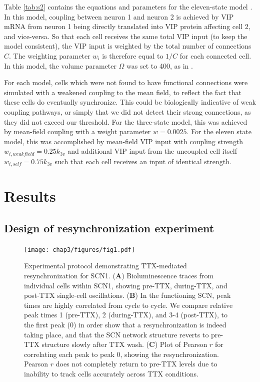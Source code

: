 Table \ref{tab:s2} contains the equations and parameters for the eleven-state model \cite{Abel2015a}.
In this model, coupling between neuron 1 and neuron 2 is achieved by VIP mRNA from neuron 1 being directly translated into VIP protein affecting cell 2, and vice-versa.
So that each cell receives the same total VIP input (to keep the model consistent), the VIP input is weighted by the total number of connections $C$.
The weighting parameter $w_i$ is therefore equal to $1/C$ for each connected cell.
In this model, the volume parameter $\Omega$ was set to 400, as in \cite{Abel2015a}.

For each model, cells which were not found to have functional connections were simulated with a weakened coupling to the mean field, to reflect the fact that these cells do eventually synchronize.
This could be biologically indicative of weak coupling pathways, or simply that we did not detect their strong connections, as they did not exceed our threshold.
For the three-state model, this was achieved by mean-field coupling with a weight parameter $w=0.0025$.
For the eleven state model, this was accomplished by mean-field VIP input with coupling strength $w_{i,weakfield}=0.25k_{3v}$ and additional VIP input from the uncoupled cell itself $w_{i,self}=0.75k_{3v}$ such that each cell receives an input of identical strength.








\section{Results}
\subsection*{Design of resynchronization experiment}

\begin{figure}[p]
    \begin{center}
        \texttt{[image: chap3/figures/fig1.pdf]}
    \end{center}
    \caption{\label{fig:expt}Experimental protocol demonstrating TTX-mediated resynchronization for SCN1. (\textbf{A}) Bioluminescence traces from individual cells within SCN1, showing pre-TTX, during-TTX, and post-TTX single-cell oscillations. 
    (\textbf{B}) In the functioning SCN, peak times are highly correlated from cycle to cycle. We compare relative peak times 1 (pre-TTX), 2 (during-TTX), and 3-4 (post-TTX), to the first peak (0) in order show that a resynchronization is indeed taking place, and that the SCN network structure reverts to pre-TTX structure slowly after TTX wash.
   (\textbf{C}) Plot of Pearson $r$ for correlating each peak to peak 0, showing the resynchronization. Pearson $r$ does not completely return to pre-TTX levels due to inability to track cells accurately across TTX conditions.}
\end{figure}



